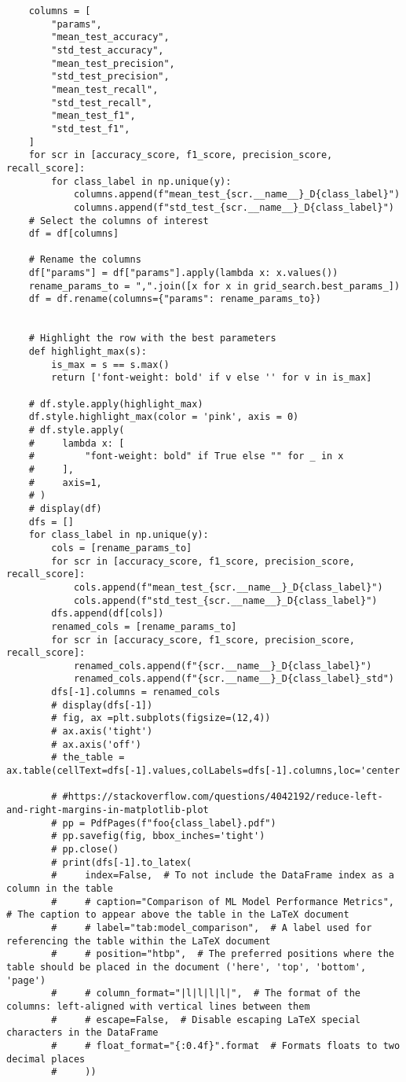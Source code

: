 \documentclass[
  english,
]{article}
\begin{document}
\begin{verbatim}
    columns = [
        "params",
        "mean_test_accuracy",
        "std_test_accuracy",
        "mean_test_precision",
        "std_test_precision",
        "mean_test_recall",
        "std_test_recall",
        "mean_test_f1",
        "std_test_f1",
    ]
    for scr in [accuracy_score, f1_score, precision_score, recall_score]:
        for class_label in np.unique(y):
            columns.append(f"mean_test_{scr.__name__}_D{class_label}")
            columns.append(f"std_test_{scr.__name__}_D{class_label}")
    # Select the columns of interest
    df = df[columns]

    # Rename the columns
    df["params"] = df["params"].apply(lambda x: x.values())
    rename_params_to = ",".join([x for x in grid_search.best_params_])
    df = df.rename(columns={"params": rename_params_to})


    # Highlight the row with the best parameters
    def highlight_max(s):
        is_max = s == s.max()
        return ['font-weight: bold' if v else '' for v in is_max]

    # df.style.apply(highlight_max)
    df.style.highlight_max(color = 'pink', axis = 0)
    # df.style.apply(
    #     lambda x: [
    #         "font-weight: bold" if True else "" for _ in x
    #     ],
    #     axis=1,
    # )
    # display(df)
    dfs = []
    for class_label in np.unique(y):
        cols = [rename_params_to]
        for scr in [accuracy_score, f1_score, precision_score, recall_score]:
            cols.append(f"mean_test_{scr.__name__}_D{class_label}")
            cols.append(f"std_test_{scr.__name__}_D{class_label}")
        dfs.append(df[cols])
        renamed_cols = [rename_params_to]
        for scr in [accuracy_score, f1_score, precision_score, recall_score]:
            renamed_cols.append(f"{scr.__name__}_D{class_label}")
            renamed_cols.append(f"{scr.__name__}_D{class_label}_std")
        dfs[-1].columns = renamed_cols
        # display(dfs[-1])
        # fig, ax =plt.subplots(figsize=(12,4))
        # ax.axis('tight')
        # ax.axis('off')
        # the_table = ax.table(cellText=dfs[-1].values,colLabels=dfs[-1].columns,loc='center')

        # #https://stackoverflow.com/questions/4042192/reduce-left-and-right-margins-in-matplotlib-plot
        # pp = PdfPages(f"foo{class_label}.pdf")
        # pp.savefig(fig, bbox_inches='tight')
        # pp.close()
        # print(dfs[-1].to_latex(
        #     index=False,  # To not include the DataFrame index as a column in the table
        #     # caption="Comparison of ML Model Performance Metrics",  # The caption to appear above the table in the LaTeX document
        #     # label="tab:model_comparison",  # A label used for referencing the table within the LaTeX document
        #     # position="htbp",  # The preferred positions where the table should be placed in the document ('here', 'top', 'bottom', 'page')
        #     # column_format="|l|l|l|l|",  # The format of the columns: left-aligned with vertical lines between them
        #     # escape=False,  # Disable escaping LaTeX special characters in the DataFrame
        #     # float_format="{:0.4f}".format  # Formats floats to two decimal places
        #     ))


\end{verbatim}
\end{document}
